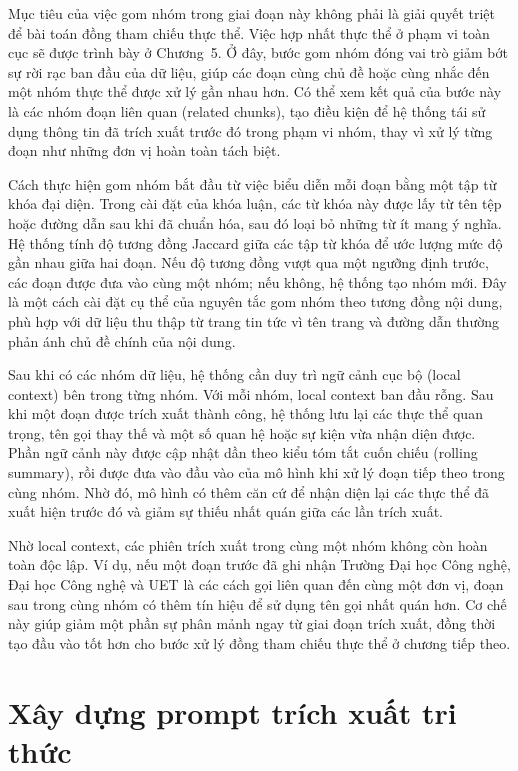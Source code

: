 Mục tiêu của việc gom nhóm trong giai đoạn này không phải là giải quyết triệt để bài toán đồng tham chiếu thực thể. Việc hợp nhất thực thể ở phạm vi toàn cục sẽ được trình bày ở Chương~5. Ở đây, bước gom nhóm đóng vai trò giảm bớt sự rời rạc ban đầu của dữ liệu, giúp các đoạn cùng chủ đề hoặc cùng nhắc đến một nhóm thực thể được xử lý gần nhau hơn. Có thể xem kết quả của bước này là các nhóm đoạn liên quan (related chunks), tạo điều kiện để hệ thống tái sử dụng thông tin đã trích xuất trước đó trong phạm vi nhóm, thay vì xử lý từng đoạn như những đơn vị hoàn toàn tách biệt.

Cách thực hiện gom nhóm bắt đầu từ việc biểu diễn mỗi đoạn bằng một tập từ khóa đại diện. Trong cài đặt của khóa luận, các từ khóa này được lấy từ tên tệp hoặc đường dẫn sau khi đã chuẩn hóa, sau đó loại bỏ những từ ít mang ý nghĩa. Hệ thống tính độ tương đồng Jaccard giữa các tập từ khóa để ước lượng mức độ gần nhau giữa hai đoạn. Nếu độ tương đồng vượt qua một ngưỡng định trước, các đoạn được đưa vào cùng một nhóm; nếu không, hệ thống tạo nhóm mới. Đây là một cách cài đặt cụ thể của nguyên tắc gom nhóm theo tương đồng nội dung, phù hợp với dữ liệu thu thập từ trang tin tức vì tên trang và đường dẫn thường phản ánh chủ đề chính của nội dung.

Sau khi có các nhóm dữ liệu, hệ thống cần duy trì ngữ cảnh cục bộ (local context) bên trong từng nhóm. Với mỗi nhóm, local context ban đầu rỗng. Sau khi một đoạn được trích xuất thành công, hệ thống lưu lại các thực thể quan trọng, tên gọi thay thế và một số quan hệ hoặc sự kiện vừa nhận diện được. Phần ngữ cảnh này được cập nhật dần theo kiểu tóm tắt cuốn chiếu (rolling summary), rồi được đưa vào đầu vào của mô hình khi xử lý đoạn tiếp theo trong cùng nhóm. Nhờ đó, mô hình có thêm căn cứ để nhận diện lại các thực thể đã xuất hiện trước đó và giảm sự thiếu nhất quán giữa các lần trích xuất.

Nhờ local context, các phiên trích xuất trong cùng một nhóm không còn hoàn toàn độc lập. Ví dụ, nếu một đoạn trước đã ghi nhận Trường Đại học Công nghệ, Đại học Công nghệ và UET là các cách gọi liên quan đến cùng một đơn vị, đoạn sau trong cùng nhóm có thêm tín hiệu để sử dụng tên gọi nhất quán hơn. Cơ chế này giúp giảm một phần sự phân mảnh ngay từ giai đoạn trích xuất, đồng thời tạo đầu vào tốt hơn cho bước xử lý đồng tham chiếu thực thể ở chương tiếp theo.

\section{Xây dựng prompt trích xuất tri thức}


